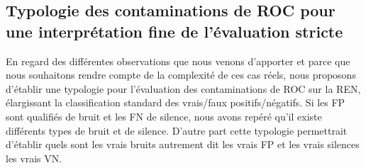 


\subsection{Typologie des contaminations de ROC pour une interprétation fine de l'évaluation stricte }
\label{subsec:Typologie_OCR-IMPACT-NER}
En regard des différentes observations que nous venons d'apporter et parce que nous souhaitons rendre compte de la complexité de ces cas réels, nous proposons d'établir une typologie pour l'évaluation des contaminations de ROC sur la REN, élargissant la classification standard des vrais/faux positifs/négatifs. Si les FP sont qualifiés de bruit et les FN de silence, nous avons repéré qu'il existe différents types de bruit et de silence. D'autre part cette typologie permettrait d'établir quels sont les vrais bruits autrement dit les vrais FP et les vrais silences les vrais VN. 


